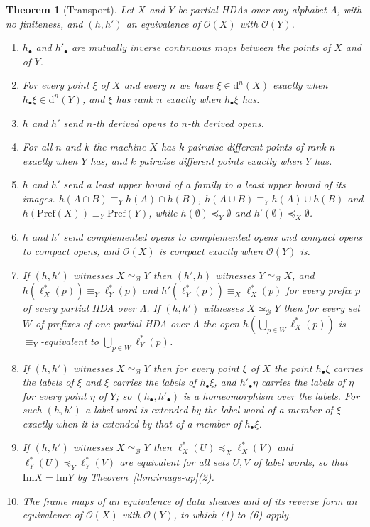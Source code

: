 \documentclass{lmcs}
\newtheorem{theorem}{Theorem}[section]
\theoremstyle{definition}
\theoremstyle{remark}
\newcommand{\Op}{\mathcal{O}}
\newcommand{\Pref}{\mathrm{Pref}}
\newcommand{\fle}[1]{\preceq_{#1}}
\newcommand{\feq}[1]{\equiv_{#1}}
\providecommand{\eqB}{\simeq_{\mathcal{B}}}
\providecommand{\lst}[1]{\ell^{*}_{#1}}
\providecommand{\Ima}{\mathrm{Im}}
\providecommand{\dset}[2]{\mathrm{d}^{#1}(#2)}
\begin{document}
\begin{theorem}[Transport]\label{thm:transport}
Let $X$ and $Y$ be partial HDAs over any alphabet $\Lambda$, with no finiteness, and $(h,h')$ an equivalence of
$\Op(X)$ with $\Op(Y)$.
\begin{enumerate}[label=(\arabic*),ref=\thetheorem(\arabic*)]
\item\label{tp:pts} $h_\bullet$ and $h'_\bullet$ are mutually inverse continuous maps between the points of $X$ and
  of $Y$.
\item\label{tp:der} For every point $\xi$ of $X$ and every $n$ we have $\xi\in\dset{n}{X}$ exactly when $h_\bullet\xi\in\dset{n}{Y}$, and $\xi$ has
  rank $n$ exactly when $h_\bullet\xi$ has.
\item\label{tp:derop} $h$ and $h'$ send $n$-th derived opens to $n$-th derived opens.
\item\label{tp:count} For all $n$ and $k$ the machine $X$ has $k$ pairwise different points of rank $n$ exactly when
  $Y$ has, and $k$ pairwise different points exactly when $Y$ has.
\item\label{tp:lat} $h$ and $h'$ send a least upper bound of a family to a least upper bound of its
  images. $h(A\cap B)\feq{Y}h(A)\cap h(B)$,
  $h(A\cup B)\feq{Y}h(A)\cup h(B)$ and
  $h(\Pref(X))\feq{Y}\Pref(Y)$, while $h(\emptyset)\fle{Y}\emptyset$ and
  $h'(\emptyset)\fle{X}\emptyset$.
\item\label{tp:cpt} $h$ and $h'$ send complemented opens to complemented opens and compact opens to compact
  opens, and $\Op(X)$ is compact exactly when $\Op(Y)$
  is.
\item\label{tp:lab} If $(h,h')$ witnesses $X\eqB Y$ then $(h',h)$ witnesses $Y\eqB X$, and
  $h(\lst{X}(p))\feq{Y}\lst{Y}(p)$ and $h'(\lst{Y}(p))\feq{X}\lst{X}(p)$ for every prefix $p$ of every partial HDA
  over $\Lambda$. If $(h,h')$ witnesses $X\eqB Y$ then for every set $W$ of prefixes
  of one partial HDA over $\Lambda$ the open $h(\bigcup_{p\in W}\lst{X}(p))$ is $\feq{Y}$-equivalent to
  $\bigcup_{p\in W}\lst{Y}(p)$.
\item\label{tp:homeo} If $(h,h')$ witnesses $X\eqB Y$ then for every point $\xi$ of $X$ the point $h_\bullet\xi$
  carries the labels of $\xi$ and $\xi$ carries the labels of
  $h_\bullet\xi$, and $h'_\bullet\eta$ carries the labels of $\eta$ for every point
  $\eta$ of $Y$; so $(h_\bullet,h'_\bullet)$ is a homeomorphism over the
  labels. For such $(h,h')$ a label word is extended by the label word of
  a member of $\xi$ exactly when it is extended by that of a member of $h_\bullet\xi$.
\item\label{tp:img} If $(h,h')$ witnesses $X\eqB Y$ then $\lst{X}(U)\fle{X}\lst{X}(V)$ and $\lst{Y}(U)\fle{Y}\lst{Y}(V)$
  are equivalent for all sets $U,V$ of label words, so that
  $\Ima X=\Ima Y$ by Theorem~\ref{thm:image-up}(2).
\item\label{tp:sh} The frame maps of an equivalence of data sheaves and of its reverse form an equivalence of $\Op(X)$
  with $\Op(Y)$, to which (1) to (6) apply.
\end{enumerate}
\end{theorem}
\end{document}

